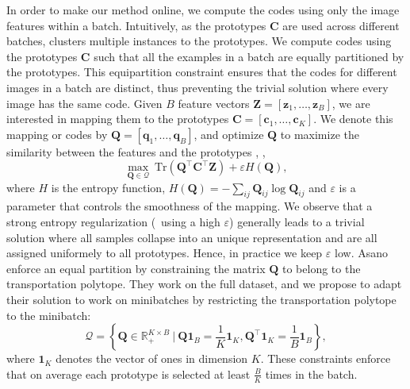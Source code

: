 In order to make our method online, we compute the codes using only the image features within a batch.
Intuitively, as the prototypes $\mathbf{C}$ are used across different batches, \OURS clusters multiple instances to the prototypes.
We compute codes using the prototypes $\mathbf{C}$ such that all the examples in a batch are equally partitioned by the prototypes. 
This equipartition constraint ensures that the codes for different images in a batch are distinct, thus preventing the trivial solution where every image has the same code.
Given $B$ feature vectors $\mathbf{Z}=[\mathbf{z}_{1},\dots,\mathbf{z}_{B}]$, we are interested in mapping them to the prototypes $\mathbf{C}=[\mathbf{c}_1,\dots,\mathbf{c}_K]$.
We denote this mapping or codes by $\mathbf{Q} = [\mathbf{q}_1, \dots, \mathbf{q}_B]$, and optimize $\mathbf{Q}$ to maximize the similarity between the features and the prototypes , \ie, 
\begin{equation}
  \label{eq:assign}
  \max_{\mathbf{Q}\in\mathcal{Q}} \ \text{Tr} \left( \mathbf{Q}^\top \mathbf{C}^\top \mathbf{Z} \right) +  \varepsilon H(\mathbf{Q}),
\end{equation}
where $H$ is the entropy function, $H(\mathbf{Q}) = -\sum_{ij} \mathbf{Q}_{ij} \log \mathbf{Q}_{ij}$ and $\varepsilon$ is a parameter that controls the smoothness of the mapping.
We observe that a strong entropy regularization (\ie~using a high $\varepsilon$) generally leads to a trivial solution where all samples collapse into an unique representation and are all assigned uniformely to all prototypes.
Hence, in practice we keep $\varepsilon$ low.
Asano \etal~\cite{asano2019self}  enforce an equal partition by constraining the matrix $\mathbf{Q}$ to belong to the transportation polytope.
They work on the full dataset, and we propose to adapt their solution to work on minibatches by restricting the transportation polytope to the minibatch:
\begin{equation}
  \mathcal{Q} = \left \{\mathbf{Q}\in\mathbb{R}_+^{K\times B} ~|~\mathbf{Q} \mathbf{1}_B = \frac{1}{K} \mathbf{1}_K, \mathbf{Q}^\top \mathbf{1}_K = \frac{1}{B} \mathbf{1}_B \right \},
\end{equation}
where $\mathbf{1}_K$ denotes the vector of ones in dimension $K$.
These constraints enforce that on average each prototype is selected at least $\frac{B}{K}$ times in the batch.

